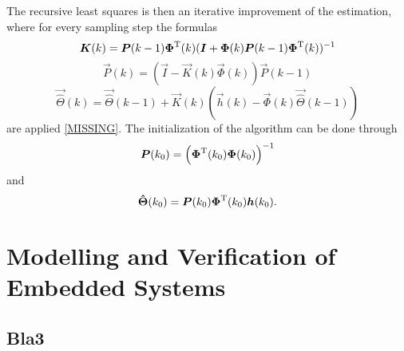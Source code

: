 The recursive least squares is then an iterative improvement of the estimation, where for every sampling step the formulas
\begin{equation}
	\boldsymbol{K}(k) = \boldsymbol{P}(k-1) \boldsymbol{\Phi}^{\mathrm{T}}(k) (\boldsymbol{I} + \boldsymbol{\Phi}(k) \boldsymbol{P}(k - 1) \boldsymbol{\Phi}^{\mathrm{T}}(k))^{-1}
\end{equation}
\begin{equation}
	\vec{P}(k) = (\vec{I} - \vec{K}(k) \vec{\Phi}(k)) \vec{P}(k - 1)
\end{equation}
\begin{equation}
	\vec{\hat \Theta}(k)=\vec{ \hat \Theta}(k - 1) + \vec{K}(k) (\vec{h}(k) - \vec{\Phi}(k) \vec{\hat \Theta}(k - 1))
\end{equation}
are applied \ref{MISSING}. The initialization of the algorithm can be done through
\begin{equation}
	\boldsymbol{P}(k_0) = \left( \boldsymbol{\Phi}^{\mathrm{T}}(k_0) \boldsymbol{\Phi}(k_0) \right)^{-1}
\end{equation}
and
\begin{equation}
	\boldsymbol{\hat \Theta} (k_0) = \boldsymbol{P}(k_0) \boldsymbol{\Phi}^{\mathrm{T}}(k_0) \boldsymbol{h}(k_0).
\end{equation}

\chapter{Modelling and Verification of Embedded Systems}

\section{Bla3}
\label{sec:bla3}
\lipsum[1] 
